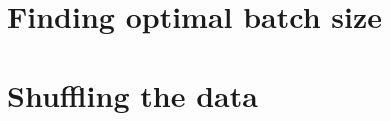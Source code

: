 \documentclass[12pt]{scrartcl}
\begin{document}
\section{Finding optimal batch size}

\section{Shuffling the data}
\end{document}
